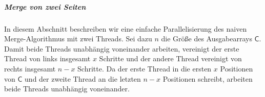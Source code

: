 \subparagraph*{Merge von zwei Seiten}
\label{dc3:erweiterung:parallel:mergezweiseiten}

In diesem Abschnitt beschreiben wir eine einfache Parallelisierung des naiven Merge-Algorithmus mit zwei Threads. Sei dazu $n$ die Größe des Ausgabearrays $\mathsf{C}$. Damit beide Threads unabhängig voneinander arbeiten, vereinigt der erste Thread von links insgesamt $x$ Schritte und der andere Thread vereinigt von rechts insgesamt $n-x$ Schritte. Da der erste Thread in die ersten $x$ Positionen von $\mathsf{C}$ und der zweite Thread an die letzten $n-x$ Positionen schreibt, arbeiten beide Threads unabhängig voneinander.